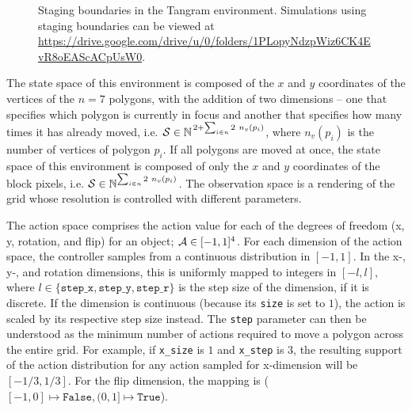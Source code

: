 \begin{figure}[h]
    \centering
    \caption[Staging boundaries in the Tangram environment.]{Staging boundaries in the Tangram environment. Simulations using staging boundaries can be viewed at \url{https://drive.google.com/drive/u/0/folders/1PLopyNdzpWiz6CK4EvR8oEAScACpUsW0}.}
    \label{fig:staging-boundaries}
\end{figure}

The state space of this environment is composed of the \(x\) and \(y\) coordinates of the vertices of the \(n = 7\) polygons, with the addition of two dimensions -- one that specifies which polygon is currently in focus and another that specifies how many times it has already moved, i.e. \(\mathcal{S} \in \mathbb{N}^{\,2 + \sum_{i \in n} 2\ n_v(p_i)}\), where \(n_v(p_i)\) is the number of vertices of polygon \(p_i\).
If all polygons are moved at once, the state space of this environment is composed of only the \(x\) and \(y\) coordinates of the block pixels, i.e. \(\mathcal{S} \in \mathbb{N}^{\sum_{i \in n} 2\ n_v(p_i)}\).
The observation space is a rendering of the grid whose resolution is controlled with different parameters.

The action space comprises the action value for each of the degrees of freedom (x, y, rotation, and flip) for an object; \(\mathcal{A} \in [-1, 1]^4\).
For each dimension of the action space, the controller samples from a continuous distribution in \([-1, 1]\).
In the x-, y-, and rotation dimensions, this is uniformly mapped to integers in \([-l, l]\), where \(l \in \{\texttt{step\_x}, \texttt{step\_y}, \texttt{step\_r}\}\) is the step size of the dimension, if it is discrete.
If the dimension is continuous (because its \texttt{size} is set to \(1\)), the action is scaled by its respective step size instead.
The \texttt{step} parameter can then be understood as the minimum number of actions required to move a polygon across the entire grid.
For example, if \texttt{x\_size} is \(1\) and \texttt{x\_step} is \(3\), the resulting support of the action distribution for any action sampled for x-dimension will be \([-1/3, 1/3]\).
For the flip dimension, the mapping is (\([-1, 0] \mapsto \texttt{False}, (0, 1] \mapsto \texttt{True}\)).

